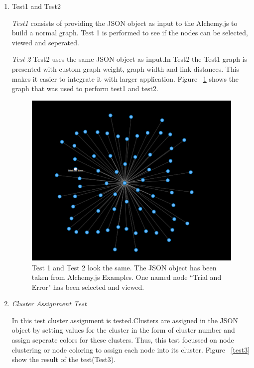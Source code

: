 \begin{enumerate}
\item Test1 and Test2
\par \textit{Test1} consists of providing the JSON object as input to the Alchemy.js to build a normal graph. Test 1 is performed to see if the nodes can be selected, viewed and seperated.
\par \textit{Test 2} Test2 uses the same JSON object as input.In Test2 the Test1 graph is presented with custom graph weight, graph width and link distances. This makes it easier to integrate it with larger application. Figure ~\ref{test1} shows the graph that was used to perform test1 and test2.

\begin{figure}[H]
\centering
\includegraphics[scale=0.3]{t1.png}
\caption{\label{test1}Test 1 and Test 2 look the same. The JSON object has been taken from Alchemy.js Examples. One named node ``Trial and Error" has been selected and viewed.}
\end{figure}

\item \textit{Cluster Assignment Test}
\par In this test cluster assignment is tested.Clusters are assigned in the JSON object by setting values for the cluster in the form of cluster number and assign seperate colors for these clusters.	Thus, this test focussed on node clustering or node coloring to assign each node into its cluster. Figure ~\ref{test3} show the result of the test(Test3). 


\end{enumerate}

